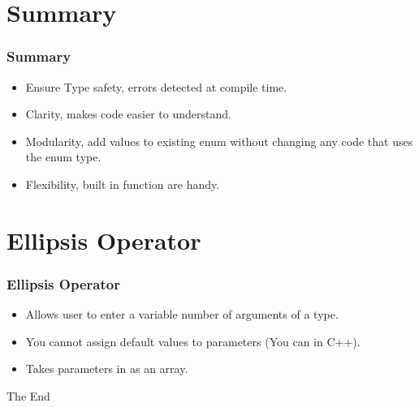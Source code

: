 \documentclass{beamer}
\begin{document}
\section{Summary}
\begin{frame}
\frametitle{Summary}
\begin{itemize}
\item Ensure {\color{green} Type safety}, errors detected at compile time.
\item {\color{red} Clarity}, makes code easier to understand.
\item {\color{orange} Modularity}, add values to existing enum without changing any code that uses the enum type.
\item {\color{purple} Flexibility}, built in function are handy.
\end{itemize}
\end{frame}
\section{Ellipsis Operator}
\begin{frame}
\frametitle{Ellipsis Operator}
\begin{itemize}
\item Allows user to enter a variable number of arguments of a type.
\item You {\color{red} cannot} assign default values to parameters (You can in C++).
\item Takes parameters in as an array.
\ellipseEx
\end{itemize}
\end{frame}
\begin{frame}
\Huge{\centerline{The End}}
\end{frame}
\end{document}
